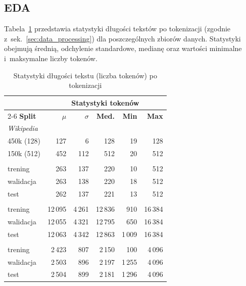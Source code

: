 \documentclass[a4paper,11pt,twoside]{report}
\theoremstyle{definition}
\begin{document}
\subsection{EDA}

Tabela~\ref{tab:eda-nested} przedstawia statystyki długości tekstów po tokenizacji (zgodnie z~sek.~\ref{sec:data_processing}) dla poszczególnych zbiorów danych.
Statystyki obejmują średnią, odchylenie standardowe, medianę oraz wartości minimalne i~maksymalne liczby tokenów.


\begin{table}[t!]
\centering
\caption{Statystyki długości tekstu (liczba tokenów) po tokenizacji}
\label{tab:eda-nested}
\smallskip
\small
\begin{tabular}{@{}l r r r r r@{}}
\toprule
& \multicolumn{5}{c}{\textbf{Statystyki tokenów}} \\
\cmidrule(lr){2-6}
\textbf{Split} & \textbf{$\mu$} & \textbf{$\sigma$} & \textbf{Med.} & \textbf{Min} & \textbf{Max} \\
\midrule
\multicolumn{6}{l}{\textit{Wikipedia}} \\
\quad 450k (128)  & 127 & 6 & 128 & 19 & 128 \\
\quad 150k (512)  & 452 & 112 & 512 & 20 & 512 \\
\addlinespace[0.5em]
\multicolumn{6}{l}{\textit{IMDb}} \\
\quad trening    & 263 & 137 & 220 & 10 & 512 \\
\quad walidacja  & 263 & 138 & 220 & 18 & 512 \\
\quad test       & 262 & 137 & 221 & 13 & 512 \\
\addlinespace[0.5em]
\multicolumn{6}{l}{\textit{arXiv}} \\
\quad trening    & 12\,095 & 4\,261 & 12\,836 & 910 & 16\,384 \\
\quad walidacja  & 12\,055 & 4\,321 & 12\,795 & 650 & 16\,384 \\
\quad test       & 12\,063 & 4\,342 & 12\,863 & 1\,009 & 16\,384 \\
\addlinespace[0.5em]
\multicolumn{6}{l}{\textit{Hyperpartisan}} \\
\quad trening    & 2\,423 & 807 & 2\,150 & 100 & 4\,096 \\
\quad walidacja  & 2\,503 & 896 & 2\,197 & 1\,255 & 4\,096 \\
\quad test       & 2\,504 & 899 & 2\,181 & 1\,296 & 4\,096 \\
\bottomrule
\end{tabular}
\end{table}
\end{document}

